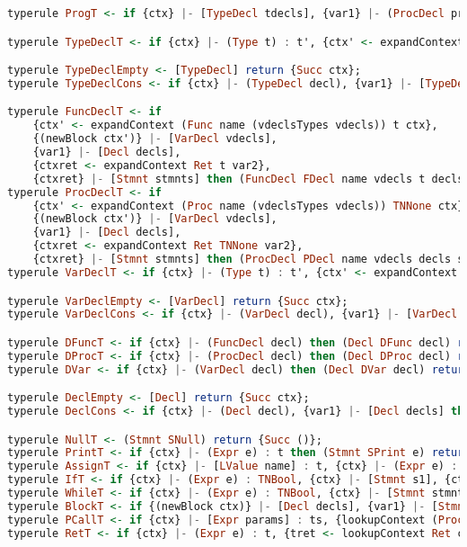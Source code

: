 \begin{lstlisting}[language=Haskell]
typerule ProgT <- if {ctx} |- [TypeDecl tdecls], {var1} |- (ProcDecl proc) then (Program Prog tdecls proc) return {Succ ()};

typerule TypeDeclT <- if {ctx} |- (Type t) : t', {ctx' <- expandContext (Typ name) t' ctx} then (TypeDecl TDecl name t) return {Succ ctx'};

typerule TypeDeclEmpty <- [TypeDecl] return {Succ ctx};
typerule TypeDeclCons <- if {ctx} |- (TypeDecl decl), {var1} |- [TypeDecl decls] then [TypeDecl decl decls] return {Succ var2};

typerule FuncDeclT <- if
    {ctx' <- expandContext (Func name (vdeclsTypes vdecls)) t ctx},
    {(newBlock ctx')} |- [VarDecl vdecls],
    {var1} |- [Decl decls],
    {ctxret <- expandContext Ret t var2},
    {ctxret} |- [Stmnt stmnts] then (FuncDecl FDecl name vdecls t decls stmnts) return {Succ ctx'};
typerule ProcDeclT <- if
    {ctx' <- expandContext (Proc name (vdeclsTypes vdecls)) TNNone ctx},
    {(newBlock ctx')} |- [VarDecl vdecls],
    {var1} |- [Decl decls],
    {ctxret <- expandContext Ret TNNone var2},
    {ctxret} |- [Stmnt stmnts] then (ProcDecl PDecl name vdecls decls stmnts) return {Succ ctx'};
typerule VarDeclT <- if {ctx} |- (Type t) : t', {ctx' <- expandContext (Var name) t' ctx} then (VarDecl VDecl name t) return {Succ ctx'};

typerule VarDeclEmpty <- [VarDecl] return {Succ ctx};
typerule VarDeclCons <- if {ctx} |- (VarDecl decl), {var1} |- [VarDecl decls] then [VarDecl decl decls] return {Succ var2};

typerule DFuncT <- if {ctx} |- (FuncDecl decl) then (Decl DFunc decl) return {Succ var1};
typerule DProcT <- if {ctx} |- (ProcDecl decl) then (Decl DProc decl) return {Succ var1};
typerule DVar <- if {ctx} |- (VarDecl decl) then (Decl DVar decl) return {Succ var1};

typerule DeclEmpty <- [Decl] return {Succ ctx};
typerule DeclCons <- if {ctx} |- (Decl decl), {var1} |- [Decl decls] then [Decl decl decls] return {Succ var2};

typerule NullT <- (Stmnt SNull) return {Succ ()};
typerule PrintT <- if {ctx} |- (Expr e) : t then (Stmnt SPrint e) return {Succ ()};
typerule AssignT <- if {ctx} |- [LValue name] : t, {ctx} |- (Expr e) : t then (Stmnt SAssign name e) return {Succ ()};
typerule IfT <- if {ctx} |- (Expr e) : TNBool, {ctx} |- [Stmnt s1], {ctx} |- [Stmnt s2] then (Stmnt SIf e s1 s2) return {Succ ()};
typerule WhileT <- if {ctx} |- (Expr e) : TNBool, {ctx} |- [Stmnt stmnts] then (Stmnt SWhile e stmnts) return {Succ ()};
typerule BlockT <- if {(newBlock ctx)} |- [Decl decls], {var1} |- [Stmnt stmnts] then (Stmnt SBlock decls stmnts) return {Succ ()};
typerule PCallT <- if {ctx} |- [Expr params] : ts, {lookupContext (Proc name ts) ctx :: JetError Type} then (Stmnt SCall name params) return {Succ ()};
typerule RetT <- if {ctx} |- (Expr e) : t, {tret <- lookupContext Ret ctx}, {if tret == t then Succ () else Fail "Type error"} then (Stmnt SReturn e) return {Succ ()};


\end{lstlisting}

